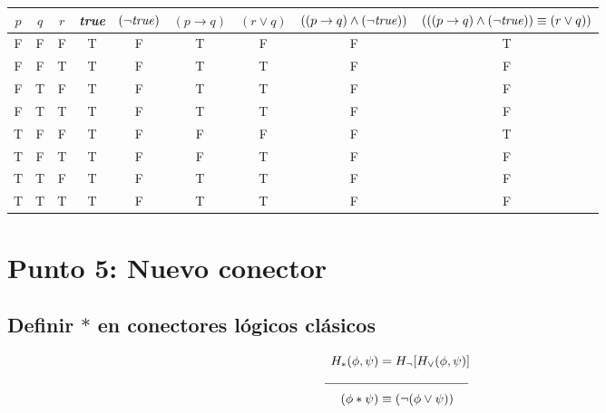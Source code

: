 \documentclass{article}
\begin{document}
\begin{center}
    \begin{NiceTabular}{|c|c|c|c|c|c|c|c|c|}
        \hline
        $p$ & $q$ & $r$ & \textit{true} & $(\lnot \textrm{\textit{true}})$ & $(p \to q)$ & $(r \vee q)$ & $((p \to q) \wedge (\lnot \textrm{\textit{true}}))$ & $(((p \to q) \wedge (\lnot \textrm{\textit{true}})) \equiv (r \vee q))$\\
        \hline
        \ttfamily F & \ttfamily F & \ttfamily F & \ttfamily T & \ttfamily F & \ttfamily T & \ttfamily F & \ttfamily F & \ttfamily T\\
        \ttfamily F & \ttfamily F & \ttfamily T & \ttfamily T & \ttfamily F & \ttfamily T & \ttfamily T & \ttfamily F & \ttfamily F\\
        \ttfamily F & \ttfamily T & \ttfamily F & \ttfamily T & \ttfamily F & \ttfamily T & \ttfamily T & \ttfamily F & \ttfamily F\\
        \ttfamily F & \ttfamily T & \ttfamily T & \ttfamily T & \ttfamily F & \ttfamily T & \ttfamily T & \ttfamily F & \ttfamily F\\
        \ttfamily T & \ttfamily F & \ttfamily F & \ttfamily T & \ttfamily F & \ttfamily F & \ttfamily F & \ttfamily F & \ttfamily T\\
        \ttfamily T & \ttfamily F & \ttfamily T & \ttfamily T & \ttfamily F & \ttfamily F & \ttfamily T & \ttfamily F & \ttfamily F\\
        \ttfamily T & \ttfamily T & \ttfamily F & \ttfamily T & \ttfamily F & \ttfamily T & \ttfamily T & \ttfamily F & \ttfamily F\\
        \ttfamily T & \ttfamily T & \ttfamily T & \ttfamily T & \ttfamily F & \ttfamily T & \ttfamily T & \ttfamily F & \ttfamily F\\
        \hline
    \end{NiceTabular}
\end{center}
\section{Punto 5: Nuevo conector}
\subsection{Definir $*$ en conectores lógicos clásicos}
\begin{alignat*}{2}
    H_{*}(\phi, \psi) &= H_{\lnot}[H_{\vee} (\phi , \psi)]\\
    \makebox[1.5cm]{\hrulefill}& \makebox[2.5cm]{\hrulefill}\\
    (\phi * \psi)  &\equiv (\lnot (\phi \vee \psi)) 
\end{alignat*}
\end{document}
